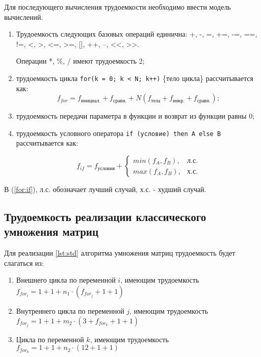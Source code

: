 Для последующего вычисления трудоемкости необходимо ввести модель вычислений.

\begin{enumerate}
	
	\item Трудоемкость следующих базовых операций единична:
	+, -, =, +=, -=, ==, !=, <, >, <=, >=, [], ++, --, <<, >>.
	
	Операции *, \%, / имеют трудоемкость 2;
	
	\item трудоемкость цикла \texttt{for(k = 0; k < N; k++)} \{тело цикла\} рассчитывается как:
	\begin{equation}
		\label{for:for}
		f_{for} = f_{\text{инициал.}} + f_{\text{сравн.}} + N(f_{\text{тела}} + f_{\text{инкр.}} + f_{\text{сравн.}});
	\end{equation}
	
	\item трудоемкость передачи параметра в функции и возврат из функции равны 0;
	\item трудоемкость условного оператора \texttt{if (условие) then A else B} рассчитывается как:
	
	\begin{equation}
		\label{for:if}
		f_{if} = f_{\text{условия}} +
		\begin{cases}
			min(f_A, f_B), & \text{л.с.}\\
			max(f_A, f_B), & \text{х.с.}
		\end{cases}
	\end{equation}
	
\end{enumerate}

В (\ref{for:if}), л.с. обозначает лучший случай, х.с. - худший случай.

\subsection{Трудоемкость реализации классического умножения матриц}

Для реализации \ref{lst:std} алгоритма умножения матриц трудоемкость будет слагаться из:
\begin{enumerate}
	\item Внешнего цикла по переменной $i$, имеющим трудоемкость $f_{for_i} = 1 + 1 + n_{1}\cdot(f_{for_j} + 1 + 1)$
	\item Внутреннего цикла по переменной $j$, имеющим трудоемкость $f_{for_j} = 1 + 1 + m_{2} \cdot(3 + f_{for_k}+ 1 +1)$
	\item Цикла по переменной $k$, имеющим трудоемкость $f_{for_k} = 1 + 1 + n_{2} \cdot(12  + 1 + 1)$
\end{enumerate}

